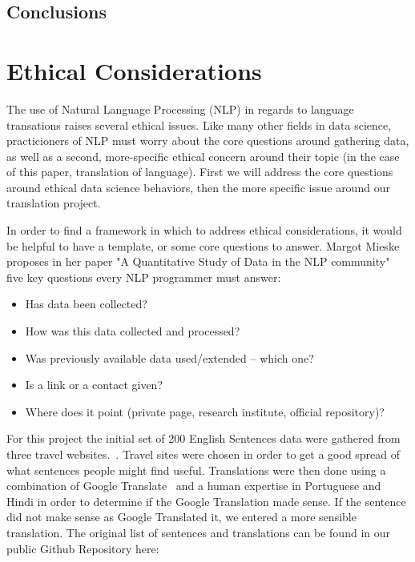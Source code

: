 \documentclass[runningheads]{llncs}
\begin{document}
	\subsection{Conclusions}
	
	\section{Ethical Considerations}
	The use of Natural Language Processing (NLP) in regards to language transations raises several ethical issues. Like many other fields in data science, practicioners of NLP must worry about the core questions around gathering data, as well as a second, more-specific ethical concern around their topic (in the case of this paper, translation of language). First we will address the core questions around ethical data science behaviors, then the more specific issue around our translation project.

In order to find a framework in which to address ethical considerations, it would be helpful to have a template, or some core questions to answer. Margot Mieske proposes in her paper "A Quantitative Study of Data in the NLP community" five key questions every NLP programmer must answer: ~\cite{ref_url8}


\begin{itemize}
	\item Has data been collected? 
	\item How was this data collected and processed? 
 	\item Was previously available data used/extended – which one? 
	\item Is a link or a contact given? 
	\item Where does it point (private page, research institute, official repository)?
\end{itemize}

For this project the initial set of 200 English Sentences data were gathered from three travel websites.~\cite{ref_url11,ref_url9,ref_url13}. Travel sites were chosen in order to get a good spread of what sentences people might find useful. Translations were then done using a combination of Google Translate~\cite{ref_url14} and a human expertise in Portuguese and Hindi in order to determine if the Google Translation made sense. If the sentence did not make sense as Google Translated it, we entered a more sensible translation. The original list of sentences and translations can be found in our public Github Repository here:
\end{document}
